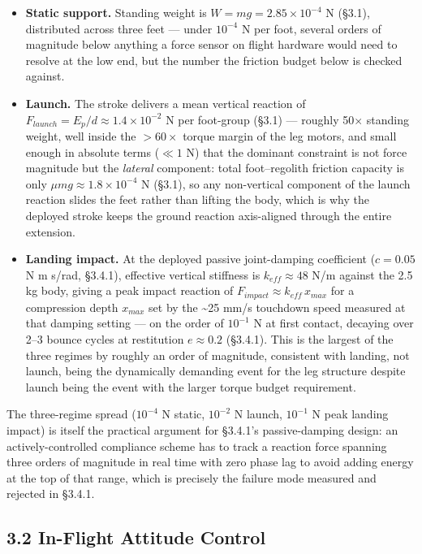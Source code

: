 \documentclass[conference]{IEEEtran}
\begin{document}
\begin{itemize}
\item \textbf{Static support.} Standing weight is $W = mg = 2.85\times10^{-4}$ N (\S3.1), distributed across three feet --- under \ensuremath{10^{-4}} N per foot, several orders of magnitude below anything a force sensor on flight hardware would need to resolve at the low end, but the number the friction budget below is checked against.
\item \textbf{Launch.} The stroke delivers a mean vertical reaction of $F_{launch} = E_p/d \approx 1.4\times10^{-2}$ N per foot-group (\S3.1) --- roughly 50$\times$ standing weight, well inside the $>60\times$ torque margin of the leg motors, and small enough in absolute terms ($\ll 1$ N) that the dominant constraint is not force magnitude but the \emph{lateral} component: total foot--regolith friction capacity is only $\mu mg \approx 1.8\times10^{-4}$ N (\S3.1), so any non-vertical component of the launch reaction slides the feet rather than lifting the body, which is why the deployed stroke keeps the ground reaction axis-aligned through the entire extension.
\item \textbf{Landing impact.} At the deployed passive joint-damping coefficient ($c = 0.05$ N\,\textperiodcentered\,m\,\textperiodcentered\,s/rad, \S3.4.1), effective vertical stiffness is $k_{eff} \approx 48$ N/m against the 2.5 kg body, giving a peak impact reaction of $F_{impact} \approx k_{eff}\,x_{max}$ for a compression depth $x_{max}$ set by the \textasciitilde{}25 mm/s touchdown speed measured at that damping setting --- on the order of $10^{-1}$ N at first contact, decaying over 2--3 bounce cycles at restitution $e \approx 0.2$ (\S3.4.1). This is the largest of the three regimes by roughly an order of magnitude, consistent with landing, not launch, being the dynamically demanding event for the leg structure despite launch being the event with the larger torque budget requirement.
\end{itemize}

The three-regime spread ($10^{-4}$ N static, $10^{-2}$ N launch, $10^{-1}$ N peak landing impact) is itself the practical argument for \S3.4.1's passive-damping design: an actively-controlled compliance scheme has to track a reaction force spanning three orders of magnitude in real time with zero phase lag to avoid adding energy at the top of that range, which is precisely the failure mode measured and rejected in \S3.4.1.

\subsection*{3.2 In-Flight Attitude Control}
\end{document}
